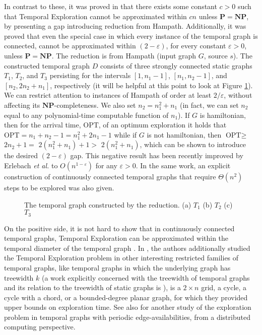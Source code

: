 \documentclass[oribibl, 11pt]{llncs}
\newcommand{\rem}{\mathbf}
\newcommand{\OPT}{\text{OPT}}
\begin{document}
In contrast to these, it was proved in \cite{MS14} that there exists some constant $c>0$ such that {\sc Temporal Exploration} cannot be approximated within $cn$ unless $\rem{P}=\rem{NP}$, by presenting a gap introducing reduction from {\sc Hampath}. Additionally, it was proved that even the special case in which every instance of the temporal graph is connected, cannot be approximated within $(2-\varepsilon)$, for every constant $\varepsilon>0$, unless $\rem{P}=\rem{NP}$. The reduction is from {\sc Hampath} (input graph $G$, source $s$). The constructed temporal graph $D$ consists of three strongly connected static graphs $T_1$, $T_2$, and $T_3$ persisting for the intervals $[1,n_1-1]$, $[n_1,n_2-1]$, and $[n_2,2n_2+n_1]$, respectively (it will be helpful at this point to look at Figure \ref{fig:oneint}). We can restrict attention to instances of {\sc Hampath} of order at least $2/\varepsilon$, without affecting its $\rem{NP}$-completeness. We also set $n_2=n_1^2+n_1$ (in fact, we can set $n_2$ equal to any polynomial-time computable function of $n_1$). If $G$ is hamiltonian, then for the arrival time, $\OPT$, of an optimum exploration it holds that $\OPT=n_1+n_2-1=n_1^2+2n_1-1$ while if $G$ is not hamiltonian, then $\OPT\geq$  $2n_2+1=$ $2(n_1^2+n_1)+1>$ $2(n_1^2+n_1)$, which can be shown to introduce the desired $(2-\varepsilon)$ gap. This negative result has been recently improved by Erlebach \emph{et al.} \cite{EHK15} to $O(n^{1-\varepsilon})$ for any $\varepsilon>0$. In the same work, an explicit construction of continuously connected temporal graphs that require $\Theta(n^2)$ steps to be explored was also given. 

\begin{figure}[!hbtp]
   \caption{The temporal graph constructed by the reduction. (a) $T_1$ (b) $T_2$ (c) $T_3$} \label{fig:oneint}
\end{figure}

On the positive side, it is not hard to show that in continuously connected temporal graphs, {\sc Temporal Exploration} can be approximated within the temporal diameter of the temporal graph \cite{MS14}. In \cite{EHK15}, the authors additionally studied the {\sc Temporal Exploration} problem in other interesting restricted families of temporal graphs, like temporal graphs in which the underlying graph has treewidth $k$ (a work explicitly concerned with the treewidth of temporal graphs and its relation to the treewidth of static graphs is \cite{MM13}), is a $2\times n$ grid, a cycle, a cycle with a chord, or a bounded-degree planar graph, for which they provided upper bounds on exploration time. See also \cite{FMS09} for another study of the exploration problem in temporal graphs with periodic edge-availabilities, from a distributed computing perspective.
\end{document}
